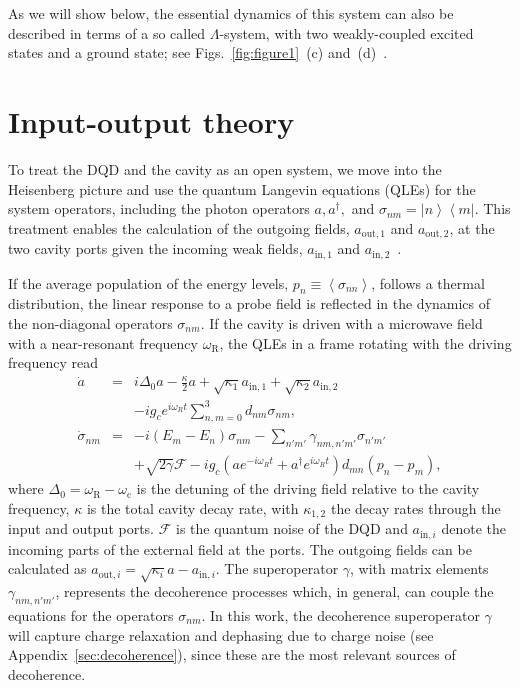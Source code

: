 \documentclass[twocolumn,english,aps,prl,preprint,reprint,showpacs,longbibliography,showkeys]{revtex4-1}
\begin{document}
As we will show below, the essential dynamics of this system can also be described in terms of a so called $\Lambda$-system, with two weakly-coupled excited states and a ground state; see Figs.~\ref{fig:figure1}~(c) and~(d)~\cite{Palmer2015,Kubo,Jacques2016}.




\section{Input-output theory}
\label{sec:input-output}

To treat the DQD and the cavity as an open system, we move into the Heisenberg picture and use the  quantum Langevin equations (QLEs) for the system operators, including the photon operators $a,a^{\dagger},$ and $\sigma_{nm}=\left|n\right\rangle\left\langle m\right|$.  This treatment enables the calculation of the outgoing fields, $a_{\mathrm{out},1}$ and $a_{\mathrm{out},2}$, at the two  cavity ports given the incoming weak fields, $a_{\mathrm{in},1}$ and $a_{\mathrm{in},2}$~\citep{Collett1984,Gardiner1985,Burkard2016}.

If the average population of the energy levels, $p_n\equiv\left\langle \sigma_{nn}\right\rangle$,  follows a thermal distribution, the linear response to a probe field is reflected in the dynamics of the non-diagonal operators $\sigma_{nm}$. 
If the cavity is driven with a microwave field with a near-resonant frequency $\omega_{\mathrm{R}}$, the QLEs in a frame rotating with the driving frequency read
\begin{eqnarray}
\dot{a} & =&i \Delta_0 a-\frac{\kappa}{2} a+\sqrt{\kappa_1}a_{\mathrm{in},1}+\sqrt{\kappa_2}a_{\mathrm{in},2}\label{eq:LLangevin1}\\
&& -i g_c e^{i\omega_{R}t} \sum_{n,m=0}^{3}d_{nm}\sigma_{nm},\nonumber\\
\dot{\sigma}_{nm} & =&-i \left(E_m-E_n\right) \sigma_{nm}-\sum_{n'm'}\gamma_{nm,n'm'} \sigma_{n'm'}  \label{eq:LLangevin3}\\
&&+\sqrt{2\gamma}\mathcal{F}  -i g_c \left(a e^{-i\omega_{R}t}+a^{\dagger} e^{i\omega_{R}t} \right)d_{mn}(p_n-p_m), \nonumber
\end{eqnarray} 
where $\Delta_0=\omega_{\mathrm{R}}-\omega_{\mathrm{c}}$ is the   detuning of the driving field relative to the cavity frequency, $\kappa$ is the total cavity decay rate, with $\kappa_{1,2}$ the decay rates through the input and output ports. 
$\mathcal{F}$  is the quantum noise of the DQD and $a_{\mathrm{in},i}$ denote the incoming parts of the external field at the ports. The outgoing fields can be calculated as $a_{\mathrm{out},i}=\sqrt{\kappa_i}a-a_{\mathrm{in},i}$.
The superoperator  $\gamma$, with matrix elements $\gamma_{nm,n'm'}$, represents the decoherence  processes which, in general, can couple  the equations for the operators $\sigma_{nm}$. 
In this work, the decoherence superoperator $\gamma$ will capture charge relaxation and dephasing due to charge noise (see Appendix~\ref{sec:decoherence}), since these are the most relevant sources of decoherence.
\end{document}
